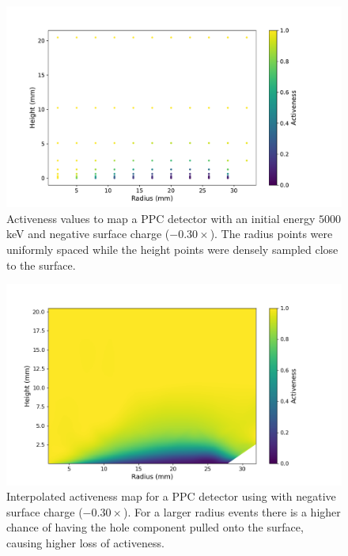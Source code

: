 \begin{figure}%
\includegraphics[trim={0cm 0.5cm 3.2cm 1.15cm},clip,width=0.95\linewidth]{ch5/figs/activenss_map_ponama_1_-0.3_5000.pdf}
\caption{Activeness values to map a PPC detector \ehd with an initial energy $5000$ keV and negative surface charge ($-0.30\times${\scunit}). The radius points were uniformly spaced while the height points were densely sampled close to the surface.}
\label{ch5_fig_activeness_points_neg}
\end{figure}

\begin{figure}%
\centering
\includegraphics[trim={1.0cm 0.5cm 3.2cm 1.5cm},clip,width=0.95\linewidth]{ch5/figs/activeness_map_cubic_sc=-0.3_ponama_1_5000_linear_full.png}
\caption{Interpolated activeness map for a PPC detector using \ehd with negative surface charge ($-0.30\times${\scunit}). For a larger radius events there is a higher chance of having the hole component pulled onto the surface, causing higher loss of activeness.}
\label{ch5_fig_activeness_map_neg}
\end{figure}

